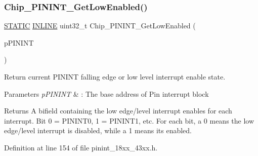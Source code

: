 \subsubsection{\texorpdfstring{Chip\+\_\+\+P\+I\+N\+I\+N\+T\+\_\+\+Get\+Low\+Enabled()}{Chip\_PININT\_GetLowEnabled()}}
{\footnotesize\ttfamily \hyperlink{group___l_p_c___types___public___macros_ga10b2d890d871e1489bb02b7e70d9bdfb}{S\+T\+A\+T\+IC} \hyperlink{spifi__18xx__43xx_8h_a2eb6f9e0395b47b8d5e3eeae4fe0c116}{I\+N\+L\+I\+NE} uint32\+\_\+t Chip\+\_\+\+P\+I\+N\+I\+N\+T\+\_\+\+Get\+Low\+Enabled (\begin{DoxyParamCaption}\item[{\hyperlink{struct_l_p_c___p_i_n___i_n_t___t}{L\+P\+C\+\_\+\+P\+I\+N\+\_\+\+I\+N\+T\+\_\+T} $\ast$}]{p\+P\+I\+N\+I\+NT }\end{DoxyParamCaption})}



Return current P\+I\+N\+I\+NT falling edge or low level interrupt enable state. 


\begin{DoxyParams}{Parameters}
{\em p\+P\+I\+N\+I\+NT} & \+: The base address of Pin interrupt block \\
\hline
\end{DoxyParams}
\begin{DoxyReturn}{Returns}
A bifield containing the low edge/level interrupt enables for each interrupt. Bit 0 = P\+I\+N\+I\+N\+T0, 1 = P\+I\+N\+I\+N\+T1, etc. For each bit, a 0 means the low edge/level interrupt is disabled, while a 1 means it\textquotesingle{}s enabled. 
\end{DoxyReturn}


Definition at line 154 of file pinint\+\_\+18xx\+\_\+43xx.\+h.

\mbox{\label{group___p_i_n_i_n_t__18_x_x__43_x_x_ga41e14d3b9450d31efea7c1c35081426b}} 
